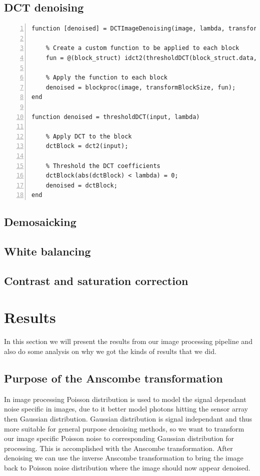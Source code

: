\documentclass[12pt,a4paper,english
]{tunithesis}
\begin{document}
\section{DCT denoising}
\begin{lstlisting}[style=Matlab-editor, numbers=left, basicstyle=\small]
function [denoised] = DCTImageDenoising(image, lambda, transformBlockSize)

    % Create a custom function to be applied to each block
    fun = @(block_struct) idct2(thresholdDCT(block_struct.data, lambda));

    % Apply the function to each block
    denoised = blockproc(image, transformBlockSize, fun);
end

function denoised = thresholdDCT(input, lambda)

    % Apply DCT to the block
    dctBlock = dct2(input);

    % Threshold the DCT coefficients
    dctBlock(abs(dctBlock) < lambda) = 0;
    denoised = dctBlock;
end
\end{lstlisting}

\section{Demosaicking}

\section{White balancing}

\section{Contrast and saturation correction}



\chapter{Results}
\label{sec:results}
In this section we will present the results from our image processing pipeline and also do some analysis on why we got the kinds of results that we did.

\section{Purpose of the Anscombe transformation}
In image processing Poisson distribution is used to model the signal dependant noise specific in images, due to it better model photons hitting the sensor array then Gaussian distribution. Gaussian distribution is signal independant and thus more suitable for general purpose denoising methods, so we want to transform our image specific Poisson noise to corresponding Gaussian distribution for processing. This is accomplished with the Anscombe transformation. After denoising we can use the inverse Anscombe transformation to bring the image back to Poisson noise distribution where the image should now appear denoised.
\end{document}
